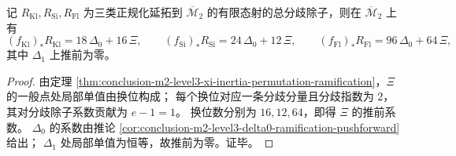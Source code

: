 \begin{corollary}\label{cor:conclusion-m2-level3-xi-ramification-pushforward}
记 \(R_{\mathrm{Kl}},R_{\mathrm{Si}},R_{\mathrm{Fl}}\) 为三类正规化延拓到 \(\overline{\mathcal M}_2\) 的有限态射的总分歧除子，则在 \(\overline{\mathcal M}_2\) 上有
\[
(f_{\mathrm{Kl}})_*R_{\mathrm{Kl}}=18\,\Delta_0+16\,\Xi,\qquad
(f_{\mathrm{Si}})_*R_{\mathrm{Si}}=24\,\Delta_0+12\,\Xi,\qquad
(f_{\mathrm{Fl}})_*R_{\mathrm{Fl}}=96\,\Delta_0+64\,\Xi,
\]
其中 \(\Delta_1\) 上推前为零。
\end{corollary}
\begin{proof}
由定理 \ref{thm:conclusion-m2-level3-xi-inertia-permutation-ramification}，\(\Xi\) 的一般点处局部单值由换位构成；
每个换位对应一条分歧分量且分歧指数为 \(2\)，其对分歧除子系数贡献为 \(e-1=1\)。
换位数分别为 \(16,12,64\)，即得 \(\Xi\) 的推前系数。
\(\Delta_0\) 的系数由推论 \ref{cor:conclusion-m2-level3-delta0-ramification-pushforward} 给出；
\(\Delta_1\) 处局部单值为恒等，故推前为零。证毕。
\end{proof}


